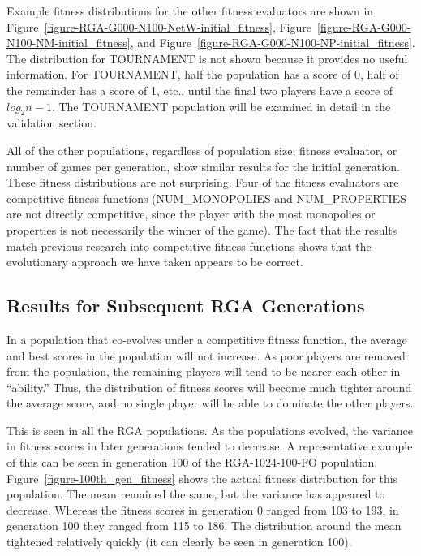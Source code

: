 Example fitness distributions for the other fitness evaluators are shown in
Figure~\ref{figure-RGA-G000-N100-NetW-initial_fitness},
Figure~\ref{figure-RGA-G000-N100-NM-initial_fitness}, and
Figure~\ref{figure-RGA-G000-N100-NP-initial_fitness}. The distribution for
TOURNAMENT is not shown because it provides no useful information. For
TOURNAMENT, half the population has a score of 0, half of the remainder has a
score of 1, etc., until the final two players have a score of \(log_{2} n-1\).
The TOURNAMENT population will be examined in detail in the validation section.

All of the other populations, regardless of population size, fitness evaluator,
or number of games per generation, show similar results for the initial
generation. These fitness distributions are not surprising. Four of the fitness
evaluators are competitive fitness functions (NUM\_MONOPOLIES and
NUM\_PROPERTIES are not directly competitive, since the player with the most
monopolies or properties is not necessarily the winner of the game). The fact
that the results match previous research into competitive fitness functions
shows that the evolutionary approach we have taken appears to be correct.

\subsection{Results for Subsequent RGA Generations}

In a population that co-evolves under a competitive fitness function, the
average and best scores in the population will not increase. As poor players are
removed from the population, the remaining players will tend to be nearer each
other in ``ability.'' Thus, the distribution of fitness scores will become much
tighter around the average score, and no single player will be able to dominate
the other players.

This is seen in all the RGA populations. As the populations evolved, the
variance in fitness scores in later generations tended to decrease. A
representative example of this can be seen in generation 100 of the
RGA-1024-100-FO population. Figure~\ref{figure-100th_gen_fitness} shows the
actual fitness distribution for this population. The mean remained the same, but
the variance has appeared to decrease. Whereas the fitness scores in generation
0 ranged from 103 to 193, in generation 100 they ranged from 115 to 186. The
distribution around the mean tightened relatively quickly (it can clearly be
seen in generation 100). 

